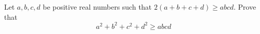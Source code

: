 Let $a,b,c,d$ be positive real numbers such that $ 2(a+b+c+d)\ge abcd $. Prove that \[ a^2+b^2+c^2+d^2 \ge abcd \]